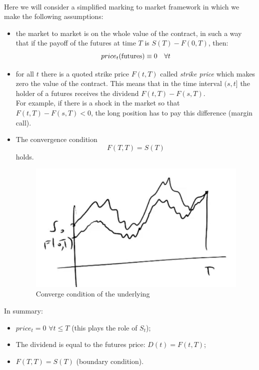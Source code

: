 \\
Here we will consider a simplified marking to market framework in which we make the following assumptions: 
\begin{itemize}
    \item the market to market is on the whole value of the contract, in such a way that if the payoff of the futures at time $T$ is $S(T)-F(0,T)$, then:
    \begin{equation*}
        price_t(\operatorname{futures}) \equiv 0 \quad\forall t
    \end{equation*} %
    \item for all $t$ there is a quoted strike price $F(t,T)$ called \emph{strike price} which makes zero the value of the contract. This means that in the time interval $(s,t]$ the holder of a futures receives the dividend $F(t,T) - F(s,T)$.\\
    For example, if there is a shock in the market so that $F(t,T) - F(s,T) < 0$, the long position has to pay this difference (margin call).
    \item The convergence condition
    \begin{equation}
        F(T,T) = S(T)
    \end{equation}
    holds.
    \begin{figure}[h]
        \centering
        \includegraphics[scale=0.32]{fig/tmp/fig32.png}
        \caption{Converge condition of the underlying}
        \label{fig:concond}
    \end{figure}
\end{itemize}
In summary:
\begin{itemize}
    \item $price_t = 0$ $\forall t\le T$ (this plays the role of $S_t$);
    \item The dividend is equal to the futures price: $D(t)=F(t,T)$;
    \item $F(T,T)=S(T)$ (boundary condition).
\end{itemize}
